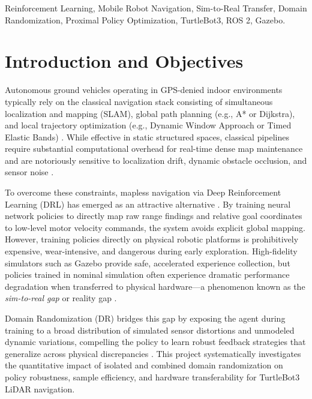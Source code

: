 \documentclass[conference]{IEEEtran}
\begin{document}
\begin{IEEEkeywords}
Reinforcement Learning, Mobile Robot Navigation, Sim-to-Real Transfer, Domain Randomization, Proximal Policy Optimization, TurtleBot3, ROS 2, Gazebo.
\end{IEEEkeywords}

\section{Introduction and Objectives}
Autonomous ground vehicles operating in GPS-denied indoor environments typically rely on the classical navigation stack consisting of simultaneous localization and mapping (SLAM), global path planning (e.g., A* or Dijkstra), and local trajectory optimization (e.g., Dynamic Window Approach or Timed Elastic Bands) \cite{macenski2020marathon2, macenski2022robot}. While effective in static structured spaces, classical pipelines require substantial computational overhead for real-time dense map maintenance and are notoriously sensitive to localization drift, dynamic obstacle occlusion, and sensor noise \cite{macenski2020marathon2}.

To overcome these constraints, mapless navigation via Deep Reinforcement Learning (DRL) has emerged as an attractive alternative \cite{tai2017virtual}. By training neural network policies to directly map raw range findings and relative goal coordinates to low-level motor velocity commands, the system avoids explicit global mapping. However, training policies directly on physical robotic platforms is prohibitively expensive, wear-intensive, and dangerous during early exploration. High-fidelity simulators such as Gazebo \cite{koenig2004design} provide safe, accelerated experience collection, but policies trained in nominal simulation often experience dramatic performance degradation when transferred to physical hardware---a phenomenon known as the \textit{sim-to-real gap} or reality gap \cite{tobin2017domain, peng2018sim}.

Domain Randomization (DR) bridges this gap by exposing the agent during training to a broad distribution of simulated sensor distortions and unmodeled dynamic variations, compelling the policy to learn robust feedback strategies that generalize across physical discrepancies \cite{tobin2017domain, peng2018sim}. This project systematically investigates the quantitative impact of isolated and combined domain randomization on policy robustness, sample efficiency, and hardware transferability for TurtleBot3 LiDAR navigation.
\end{document}

